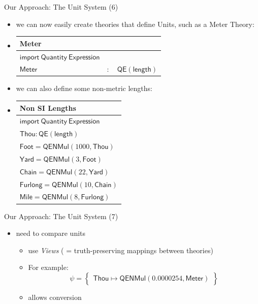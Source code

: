\documentclass{beamer}
\begin{document}
  \begin{frame}{Our Approach: The Unit System (6)}
    \begin{itemize}[<+->]
      \item we can now easily create theories that define Units, such as a Meter Theory:
      \item
          \begin{tabular}{|l l l|}
            \hline
            \textsf{Meter} &&\\\hline
            $ \mathsf{import \ Quantity\ Expression}$ &&\\
            \hline
            $\mathsf{Meter}$ & $:$ & $ \mathsf{QE} \left( \mathsf{length} \right)$\\\hline
          \end{tabular}
    \item we can also define some non-metric lengths:
    \item
      \begin{tabular}{|l|}
        \hline
        \textsf{Non SI Lengths}\\\hline
        $ \mathsf{import \ Quantity\ Expression}$\\
        \hline
        $\mathsf{Thou} : \mathsf{QE}\left( \mathsf{length} \right)$\\
        $\mathsf{Foot} = \mathsf{QENMul} \left( 1000, \mathsf{Thou} \right)$\\
        $\mathsf{Yard} = \mathsf{QENMul} \left( 3, \mathsf{Foot} \right)$\\
        $\mathsf{Chain} = \mathsf{QENMul} \left( 22, \mathsf{Yard} \right)$\\
        $\mathsf{Furlong} = \mathsf{QENMul} \left( 10, \mathsf{Chain} \right)$\\
        $\mathsf{Mile} = \mathsf{QENMul} \left( 8, \mathsf{Furlong} \right)$\\
        \hline
      \end{tabular}
    \end{itemize}
  \end{frame}

  \begin{frame}{Our Approach: The Unit System (7)}
    \begin{itemize}[<+->]
      \item need to compare units
      \begin{itemize}
        \item use \textit{Views} ( = truth-preserving mappings between theories)
        \item For example:
          \[
            \psi = \left\{\begin{array}{l}
              \mathsf{Thou} \mapsto \mathsf{QENMul} \left( 0.0000254, \mathsf{Meter} \right)
            \end{array}\right\}
          \]
        \item allows conversion
      \end{itemize}
    \end{itemize}
  \end{frame}
\end{document}
